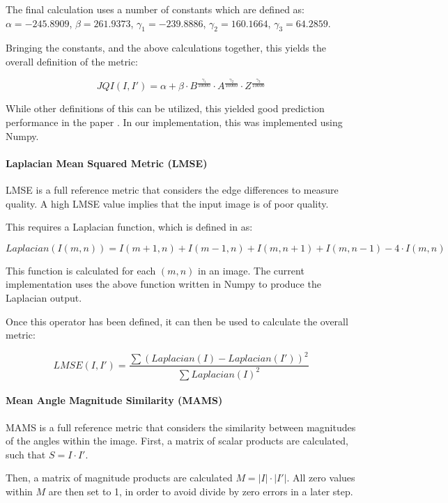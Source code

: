 \documentclass[10pt,a4paper]{article}
\begin{document}
                The final calculation uses a number of constants which are defined as:
                $\alpha = -245.8909$, $\beta = 261.9373$, $\gamma_1 = -239.8886$, $\gamma_2 = 160.1664$, $\gamma_3 = 64.2859$.

                Bringing the constants, and the above calculations together, this yields the overall definition of the metric:

                $$JQI(I, I') = \alpha + \beta \cdot B ^{\frac{\gamma_1}{10000}} \cdot A^{\frac{\gamma_2}{10000}} \cdot Z^{\frac{\gamma_3}{10000}}$$

                While other definitions of this can be utilized, this yielded good prediction performance in the paper \cite{JQIPaper}. In our implementation, this was implemented using 
                Numpy.
            \paragraph{Laplacian Mean Squared Metric (LMSE)}
                LMSE is a full reference metric that considers the edge differences to measure quality. A high LMSE value implies that the input image is of poor quality. 
                
                This requires a Laplacian function, which is defined in \cite{LMSEPaper} as:

                $$Laplacian(I(m, n)) = I(m+1, n) + I(m-1, n) + I(m, n+1) + I(m, n-1) - 4\cdot I(m, n)$$

                This function is calculated for each $(m, n)$ in an image. The current implementation uses the above function written in Numpy to produce the Laplacian output. 
                \cite{LMSEPaper}

                Once this operator has been defined, it can then be used to calculate the overall metric: 

                $$LMSE(I, I') = \frac{\sum (Laplacian(I) - Laplacian(I'))^2}{\sum Laplacian(I)^2}$$
                
            \paragraph{Mean Angle Magnitude Similarity (MAMS)}
                MAMS is a full reference metric that considers the similarity between magnitudes of the angles within the image. First, a matrix of scalar products are calculated, such that $S=I \cdot I'$.
                
                Then, a matrix of magnitude products are calculated $M = |I| \cdot |I'|$. All zero values within $M$ are then set to 1, in order to avoid divide by zero errors in a later step.
\end{document}

